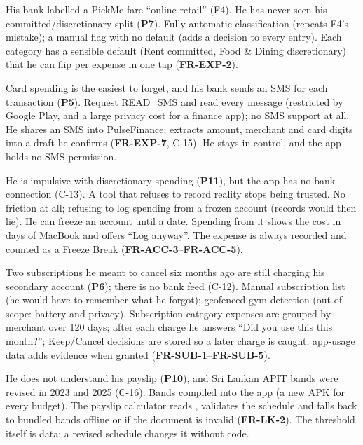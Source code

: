 \documentclass[11pt,a4paper]{article}
\newcommand{\req}[1]{\textsf{\textbf{\color{pfgreendark}#1}}}
\newcommand{\prob}[1]{\textsf{\textbf{\color{pfamberdark}#1}}}
\begin{document}
{His bank labelled a PickMe fare ``online retail'' (F4). He has never seen his committed/discretionary split (\prob{P7}).}
{Fully automatic classification (repeats F4's mistake); a manual flag with no default (adds a decision to every entry).}
{Each category has a sensible default (Rent committed, Food \& Dining discretionary) that he can flip per expense in one tap (\req{FR-EXP-2}).}

{Card spending is the easiest to forget, and his bank sends an SMS for each transaction (\prob{P5}).}
{Request READ\_SMS and read every message (restricted by Google Play, and a large privacy cost for a finance app); no SMS support at all.}
{He shares an SMS into PulseFinance;  extracts amount, merchant and card digits into a draft he confirms (\req{FR-EXP-7}, C-15). He stays in control, and the app holds no SMS permission.}

{He is impulsive with discretionary spending (\prob{P11}), but the app has no bank connection (C-13). A tool that refuses to record reality stops being trusted.}
{No friction at all; refusing to log spending from a frozen account (records would then lie).}
{He can freeze an account until a date. Spending from it shows the cost in days of MacBook and offers ``Log anyway''. The expense is always recorded and counted as a Freeze Break (\req{FR-ACC-3}--\req{FR-ACC-5}).}

{Two subscriptions he meant to cancel six months ago are still charging his secondary account (\prob{P6}); there is no bank feed (C-12).}
{Manual subscription list (he would have to remember what he forgot); geofenced gym detection (out of scope: battery and privacy).}
{Subscription-category expenses are grouped by merchant over 120 days; after each charge he answers ``Did you use this this month?''; Keep/Cancel decisions are stored so a later charge is caught; app-usage data adds evidence when granted (\req{FR-SUB-1}--\req{FR-SUB-5}).}

{He does not understand his payslip (\prob{P10}), and Sri Lankan APIT bands were revised in 2023 and 2025 (C-16).}
{Bands compiled into the app (a new APK for every budget).}
{The payslip calculator reads , validates the schedule and falls back to bundled bands offline or if the document is invalid (\req{FR-LK-2}). The threshold itself is data: a revised schedule changes it without code.}
\end{document}
